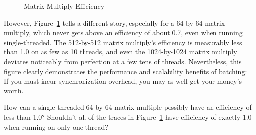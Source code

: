\begin{figure}[tbp]
\begin{center}
\end{center}
\caption{Matrix Multiply Efficiency}
\label{fig:SMPdesign:Matrix Multiply Efficiency}
\end{figure}

However,
Figure~\ref{fig:SMPdesign:Matrix Multiply Efficiency}
tells a different story, especially for a 64-by-64 matrix multiply,
which never gets above an efficiency of about 0.7, even when running
single-threaded.
The 512-by-512 matrix multiply's efficiency is measurably less
than 1.0 on as few as 10 threads, and even the 1024-by-1024 matrix
multiply deviates noticeably from perfection at a few tens of threads.
Nevertheless, this figure clearly demonstrates the performance and
scalability benefits of batching: If you must incur synchronization
overhead, you may as well get your money's worth.

\QuickQuiz{}
	How can a single-threaded 64-by-64 matrix multiple possibly
	have an efficiency of less than 1.0?
	Shouldn't all of the traces in
	Figure~\ref{fig:SMPdesign:Matrix Multiply Efficiency}
	have efficiency of exactly 1.0 when running on only one thread?
 \QuickQuizEnd

